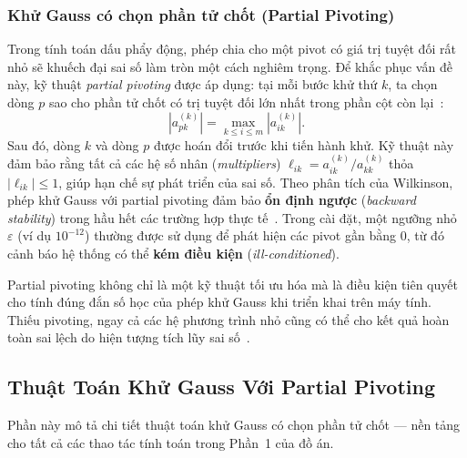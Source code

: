 \subsubsection{Khử Gauss có chọn phần tử chốt (Partial Pivoting)}

Trong tính toán dấu phẩy động, phép chia cho một pivot có giá trị tuyệt đối rất nhỏ sẽ khuếch đại sai số làm tròn một cách nghiêm trọng. Để khắc phục vấn đề này, kỹ thuật \textit{partial pivoting} được áp dụng: tại mỗi bước khử thứ $k$, ta chọn dòng $p$ sao cho phần tử chốt có trị tuyệt đối lớn nhất trong phần cột còn lại~\cite{higham2002}:
\begin{equation}
    |a^{(k)}_{pk}| = \max_{k \le i \le m} |a^{(k)}_{ik}|.
\end{equation}
Sau đó, dòng $k$ và dòng $p$ được hoán đổi trước khi tiến hành khử. Kỹ thuật này đảm bảo rằng tất cả các hệ số nhân (\textit{multipliers}) $\ell_{ik} = a^{(k)}_{ik}/a^{(k)}_{kk}$ thỏa $|\ell_{ik}| \le 1$, giúp hạn chế sự phát triển của sai số. Theo phân tích của Wilkinson, phép khử Gauss với partial pivoting đảm bảo \textbf{ổn định ngược} (\textit{backward stability}) trong hầu hết các trường hợp thực tế~\cite{higham2002, wilkinson1965}. Trong cài đặt, một ngưỡng nhỏ $\varepsilon$ (ví dụ $10^{-12}$) thường được sử dụng để phát hiện các pivot gần bằng $0$, từ đó cảnh báo hệ thống có thể \textbf{kém điều kiện} (\textit{ill-conditioned}).

\begin{note}
Partial pivoting không chỉ là một kỹ thuật tối ưu hóa mà là điều kiện tiên quyết cho tính đúng đắn số học của phép khử Gauss khi triển khai trên máy tính. Thiếu pivoting, ngay cả các hệ phương trình nhỏ cũng có thể cho kết quả hoàn toàn sai lệch do hiện tượng tích lũy sai số~\cite{trefethen1997}.
\end{note}

\subsection{Thuật Toán Khử Gauss Với Partial Pivoting}

Phần này mô tả chi tiết thuật toán khử Gauss có chọn phần tử chốt --- nền tảng cho tất cả các thao tác tính toán trong Phần~1 của đồ án.

